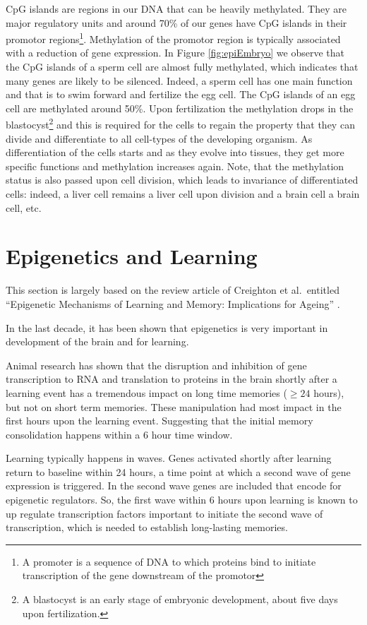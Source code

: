 \documentclass[
  11pt,
]{book}
\begin{document}
CpG islands are regions in our DNA that can be heavily methylated. They are major regulatory units and around 70\% of our genes have CpG islands in their promotor regions\footnote{A promoter is a sequence of DNA to which proteins bind to initiate transcription of the gene downstream of the promotor}. Methylation of the promotor region is typically associated with a reduction of gene expression. In Figure \ref{fig:epiEmbryo} we observe that the CpG islands of a sperm cell are almost fully methylated, which indicates that many genes are likely to be silenced. Indeed, a sperm cell has one main function and that is to swim forward and fertilize the egg cell. The CpG islands of an egg cell are methylated around 50\%. Upon fertilization the methylation drops in the blastocyst\footnote{A blastocyst is an early stage of embryonic development, about five days upon fertilization.} and this is required for the cells to regain the property that they can divide and differentiate to all cell-types of the developing organism. As differentiation of the cells starts and as they evolve into tissues, they get more specific functions and methylation increases again. Note, that the methylation status is also passed upon cell division, which leads to invariance of differentiated cells: indeed, a liver cell remains a liver cell upon division and a brain cell a brain cell, etc.

\hypertarget{epigenetics-and-learning}{%
\section{Epigenetics and Learning}\label{epigenetics-and-learning}}

This section is largely based on the review article of Creighton et al.~entitled ``Epigenetic Mechanisms of Learning and Memory: Implications for Ageing'' \citep{Creighton2020}.

In the last decade, it has been shown that epigenetics is very important in development of the brain and for learning.

Animal research has shown that the disruption and inhibition of gene transcription to RNA and translation to proteins in the brain shortly after a learning event has a tremendous impact on long time memories (\(\geq 24\) hours), but not on short term memories. These manipulation had most impact in the first hours upon the learning event. Suggesting that the initial memory consolidation happens within a 6 hour time window.

Learning typically happens in waves. Genes activated shortly after learning return to baseline within 24 hours, a time point at which a second wave of gene expression is triggered.
In the second wave genes are included that encode for epigenetic regulators.
So, the first wave within 6 hours upon learning is known to up regulate transcription factors important to initiate the second wave of transcription, which is needed to establish long-lasting memories.
\end{document}
